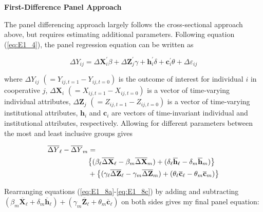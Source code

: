 \documentclass[11pt]{article}
\begin{document}
\noindent \textbf{First-Difference Panel Approach}

The panel differencing approach largely follows the cross-sectional approach above, but requires estimating additional parameters. Following equation (\ref{eq:E1_4}), the panel regression equation can be written as

\begin{equation} \label{eq:E1_7}
   \Delta Y_{ij} = \Delta \mathbf{X}_i^{\prime}\beta + \Delta \mathbf{Z}_j^{\prime}\gamma + \mathbf{h}_i^{\prime}\delta + \mathbf{c}_i^{\prime}\theta + \Delta \varepsilon_{ij}
\end{equation}  

where $\Delta Y_{ij}$ $(= Y_{ij,t=1} - Y_{ij,t=0})$ is the outcome of interest for individual $i$ in cooperative $j$, $\Delta \mathbf{X}_i$ $(= X_{ij,t=1} - X_{ij,t=0})$ is a vector of time-varying individual attributes, $\Delta \mathbf{Z}_j$ $(= Z_{ij,t=1} - Z_{ij,t=0})$ is a vector of time-varying institutional attributes, $\mathbf{h}_i$ and $\mathbf{c}_i$ are vectors of time-invariant individual and institutional attributes, respectively. Allowing for different parameters between the most and least inclusive groups gives

\begin{subequations}
    \begin{align}
        \overline{\Delta Y}_{\ell} - \overline{\Delta Y}_{m} &= \label{eq:E1_8a} \\ 
        &\big{\{}(\beta_{\ell}\overline{\Delta \mathbf{X}}_{\ell} - \beta_{m}\overline{\Delta \mathbf{X}}_{m}) + (\delta_{\ell}\overline{\mathbf{h}}_{\ell} - \delta_{m}\overline{\mathbf{h}}_{m}) \big{\}} \label{eq:E1_8b} \\ 
        &+ \big{\{}(\gamma_{\ell}\overline{\Delta \mathbf{Z}}_{\ell} - \gamma_{m}\overline{\Delta \mathbf{Z}}_{m}) + (\theta_{\ell}\overline{\mathbf{c}}_{\ell} - \theta_{m}\overline{\mathbf{c}}_{m}) \big{\}} \label{eq:E1_8c}
    \end{align}
\end{subequations}  

Rearranging equations (\ref{eq:E1_8a}-\ref{eq:E1_8c}) by adding and subtracting $(\beta_{m}\overline{\mathbf{X}}_{\ell} + \delta_{m}\overline{\mathbf{h}}_{\ell}) + (\gamma_{m}\overline{\mathbf{Z}}_{\ell} + \theta_{m}\overline{\mathbf{c}}_{\ell})$ on both sides gives my final panel equation:
\end{document}
